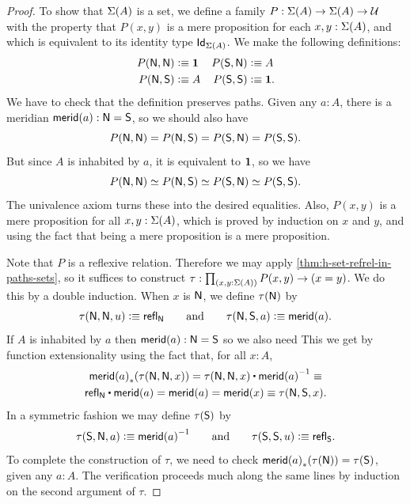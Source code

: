 \begin{proof}
To show that $\Sigma(A)$ is a set, we define a
family $P:\Sigma(A)\to\Sigma(A)\to\mathcal{U}$ with the
property that $P(x,y)$ is a mere proposition for each $x,y:\Sigma(A)$,
and which is equivalent to its identity type $\mathsf{Id}_{\Sigma(A)}$.
%
We make the following definitions:
\begin{align*}
P(\mathsf{N},\mathsf{N}) & \vcentcolon\equiv \mathbf{1} &
P(\mathsf{S},\mathsf{N}) & \vcentcolon\equiv A\\
P(\mathsf{N},\mathsf{S}) & \vcentcolon\equiv A &
P(\mathsf{S},\mathsf{S}) & \vcentcolon\equiv \mathbf{1}.
\end{align*}
We have to check that the definition preserves paths.
Given any $a : A$, there is a meridian $\mathsf{merid}(a) : \mathsf{N} = \mathsf{S}$,
so we should also have
%
\begin{equation*}
  P(\mathsf{N}, \mathsf{N}) = P(\mathsf{N}, \mathsf{S}) = P(\mathsf{S}, \mathsf{N}) = P(\mathsf{S}, \mathsf{S}).
\end{equation*}
%
But since $A$ is inhabited by $a$, it is equivalent to $\mathbf{1}$, so we have
%
\begin{equation*}
  P(\mathsf{N}, \mathsf{N}) \simeq P(\mathsf{N}, \mathsf{S}) \simeq P(\mathsf{S}, \mathsf{N}) \simeq P(\mathsf{S}, \mathsf{S}).
\end{equation*}
%
The univalence axiom turns these into the desired equalities. Also, $P(x,y)$ is a mere
proposition for all $x, y : \Sigma(A)$, which is proved by induction on $x$ and $y$, and
using the fact that being a mere proposition is a mere proposition.

Note that $P$ is a reflexive relation.
Therefore we may apply \cref{thm:h-set-refrel-in-paths-sets}, so it suffices to
construct $\tau : \prd{x,y:\susp(A)}P(x,y)\to(x=y)$. We do this by a double induction.
When $x$ is $\mathsf{N}$, we define $\tau(\mathsf{N})$ by
%
\begin{equation*}
  \tau(\mathsf{N},\mathsf{N},u) \vcentcolon\equiv \mathsf{refl}_{\mathsf{N}}
  \qquad\text{and}\qquad
  \tau(\mathsf{N},\mathsf{S},a) \vcentcolon\equiv \mathsf{merid}(a).
\end{equation*}
%
If $A$ is inhabited by $a$ then $\mathsf{merid}(a) : \mathsf{N} = \mathsf{S}$ so we also need
This we get by function extensionality using the fact that, for all $x : A$,
%
\begin{multline*}
  \trans{\merid(a)}{\tau(\north,\north,x)} =
  \tau(\north,\north,x) \ct \opp{\merid(a)} \jdeq \\
  \refl{\north} \ct \merid(a) =
  \merid(a) =
  \merid(x) \jdeq
  \tau(\north, \south, x).
\end{multline*}
In a symmetric fashion we may define $\tau(\mathsf{S})$ by
%
\begin{equation*}
  \tau(\mathsf{S},\mathsf{N}, a) \vcentcolon\equiv \mathord{{\mathsf{merid}(a)}^{-1}}
  \qquad\text{and}\qquad
  \tau(\mathsf{S},\mathsf{S}, u) \vcentcolon\equiv \mathsf{refl}_{\mathsf{S}}.
\end{equation*}
%
To complete the construction of $\tau$, we need to check ${\mathsf{merid}(a)}_{*}\mathopen{}\left({\tau(\mathsf{N})}\right)\mathclose{} = \tau(\mathsf{S})$,
given any $a : A$. The verification proceeds much along the same lines by induction on the
second argument of $\tau$.


\end{proof}
